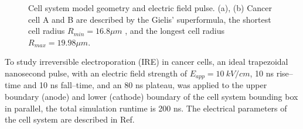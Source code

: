 \documentclass[conference]{IEEEtran}
\begin{document}
\begin{figure}[htbp]
	\centering
	\caption{Cell system model geometry and electric field pulse. (a), (b) Cancer cell A and B are described by the	Gielis’ superformula, the shortest cell radius $R_{min} = 16.8\mu m$ , and the longest cell radius $R_{max} = 19.98\mu m$.}
	\label{fig::1}
\end{figure}

To study irreversible electroporation (IRE) in cancer cells, an ideal trapezoidal nanosecond pulse, with an electric field strength of $E_{app} = 10~kV/cm$, 10 ns rise--time and 10 ns fall--time, and an 80 ns plateau, was applied to the upper boundary (anode) and lower (cathode) boundary of the cell system bounding box in parallel, the total simulation runtime is 200 ns. The electrical parameters of the cell system are described in Ref\cite{mescia2017modeling, smith2006modeling}. 
\end{document}
